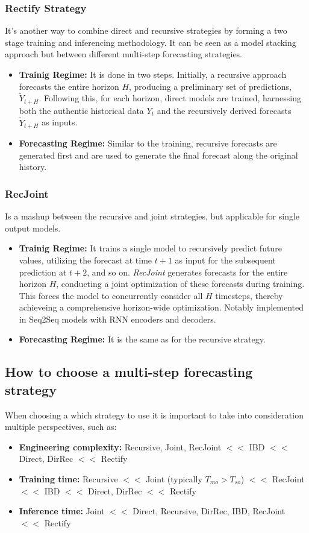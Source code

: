 \documentclass{article}
\begin{document}
\subsubsection{Rectify Strategy}
It's another way to combine direct and recursive strategies by forming a two stage training and inferencing methodology. It can be seen 
as a model stacking approach but between different multi-step forecasting strategies.
\begin{itemize}
    \item \textbf{Trainig Regime:} It is done in two steps. Initially, a recursive approach forecasts the entire horizon \(H\), producing a preliminary set of predictions, \(\tilde{Y}_{t+H}\). Following this, for each horizon, direct models are trained, harnessing both the authentic historical data \(Y_t\) and the recursively derived forecasts \(\tilde{Y}_{t+H}\) as inputs.
    \item \textbf{Forecasting Regime:} Similar to the training, recursive forecasts are generated first and are used to generate the final forecast along the original history.
\end{itemize}

\subsubsection{RecJoint}
Is a mashup between the recursive and joint strategies, but applicable for single output models.
\begin{itemize}
    \item \textbf{Trainig Regime:} It trains a single model to recursively predict future values, utilizing the forecast at time \(t + 1\) as input for the subsequent prediction at \(t + 2\), and so on. \textit{RecJoint} generates forecasts for the entire horizon \(H\), conducting a joint optimization of these forecasts during training. This forces the model to concurrently consider all \(H\) timesteps, thereby achieveing a comprehensive horizon-wide optimization. Notably implemented in Seq2Seq models with RNN encoders and decoders.
    \item \textbf{Forecasting Regime:} It is the same as for the recursive strategy. 
\end{itemize}

\subsection{How to choose a multi-step forecasting strategy}
When choosing a which strategy to use it is important to take into consideration multiple perspectives, such as:
\begin{itemize}
    \item \textbf{Engineering complexity:} Recursive, Joint, RecJoint \(<<\) IBD \(<<\) Direct, DirRec \(<<\) Rectify
    \item \textbf{Training time:} Recursive \(<<\) Joint (typically \(T_{mo} > T_{so}\)) \(<<\) RecJoint \(<<\) IBD \(<<\) Direct, DirRec \(<<\) Rectify
    \item \textbf{Inference time:} Joint \(<<\) Direct, Recursive, DirRec, IBD, RecJoint \(<<\) Rectify
\end{itemize}
\end{document}
